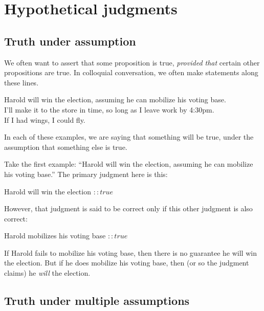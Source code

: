 \documentclass[../../../main.tex]{subfiles}
\begin{document}
\chapter{Hypothetical judgments}


\section{Truth under assumption}

We often want to assert that some proposition is true, \emph{provided that} certain other propositions are true. In colloquial conversation, we often make statements along these lines. 

\begin{center}
  Harold will win the election, assuming he can mobilize his voting base. \\
  I'll make it to the store in time, so long as I leave work by 4:30pm. \\
  If I had wings, I could fly.
\end{center}

\noindent
In each of these examples, we are saying that something will be true, under the assumption that something else is true.

Take the first example: ``Harold will win the election, assuming he can mobilize his voting base.'' The primary judgment here is this:

\begin{center}
  Harold will win the election $:: true$
\end{center}

\noindent
However, that judgment is said to be correct only if this other judgment is also correct:

\begin{center}
  Harold mobilizes his voting base $:: true$
\end{center}

\noindent
If Harold fails to mobilize his voting base, then there is no guarantee he will win the election. But if he does mobilize his voting base, then (or so the judgment claims) he \emph{will} the election.


\section{Truth under multiple assumptions}
\end{document}

